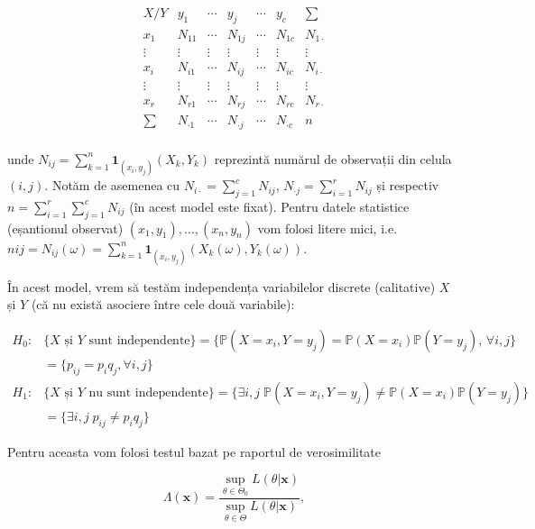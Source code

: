 \documentclass[]{article}
\begin{document}
\[
\begin{array}{c|ccccc|c}
  X / Y  &  y_1      & \cdots &  y_j     & \cdots &  y_c     & \sum\\
  \hline
  x_1      &  N_{11} & \cdots & N_{1j} & \cdots & N_{1c} & N_{1\cdot}\\
  \vdots & \vdots  & \vdots & \vdots & \vdots & \vdots & \vdots  \\
  x_i      &  N_{i1} & \cdots & N_{ij} & \cdots & N_{ic} & N_{i\cdot}\\
  \vdots & \vdots  & \vdots & \vdots & \vdots & \vdots & \vdots  \\
  x_r      &  N_{r1} & \cdots & N_{rj} & \cdots & N_{rc} & N_{r\cdot}\\
  \hline
  \sum   &  N_{\cdot 1} & \cdots & N_{\cdot j} & \cdots & N_{\cdot c} & n\\
\end{array}
\]

unde \(N_{ij} = \sum_{k = 1}^{n}\mathbf{1}_{(x_i, y_j)}(X_k,Y_k)\)
reprezintă numărul de observații din celula \((i,j)\). Notăm de asemenea
cu \(N_{i\cdot} = \sum_{j = 1}^{c}N_{ij}\),
\(N_{\cdot j} = \sum_{i = 1}^{r}N_{ij}\) și respectiv
\(n = \sum_{i = 1}^{r}\sum_{j = 1}^{c}N_{ij}\) (în acest model este
fixat). Pentru datele statistice (eșantionul observat)
\((x_1,y_1), \ldots, (x_n,y_n)\) vom folosi litere mici, i.e.
\(n{ij} = N_{ij}(\omega) = \sum_{k = 1}^{n}\mathbf{1}_{(x_i, y_j)}(X_k(\omega),Y_k(\omega))\).

În acest model, vrem să testăm independența variabilelor discrete
(calitative) \(X\) și \(Y\) (că nu există asociere între cele două
variabile):

\begin{align*}
  H_0: & \{\text{$X$ și $Y$ sunt independente}\} = \{\mathbb{P}(X = x_i, Y = y_j) = \mathbb{P}(X = x_i)\mathbb{P}(Y = y_j),\,\forall i,j\}\\
    & = \{p_{ij} = p_i q_j, \forall i,j\}\\
  H_1: & \{\text{$X$ și $Y$ nu sunt independente}\} = \{\exists i,j \; \mathbb{P}(X = x_i, Y = y_j) \neq \mathbb{P}(X = x_i)\mathbb{P}(Y = y_j)\}\\
    & = \{\exists i,j \; p_{ij} \neq p_i q_j\}
\end{align*}

Pentru aceasta vom folosi testul bazat pe raportul de verosimilitate

\[
  \Lambda(\mathbf{x})=\frac{\sup_{\theta\in\Theta_0}L(\theta|\mathbf{x})}{\sup_{\theta\in\Theta}L(\theta|\mathbf{x})},
\]
\end{document}
